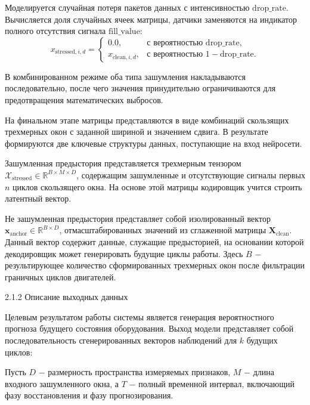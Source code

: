 \documentclass[14pt, a4paper, oneside]{extreport}
\begin{document}
Моделируется случайная потеря пакетов данных с интенсивностью $\text{drop\_rate}$. Вычисляется доля случайных ячеек матрицы, датчики заменяются на индикатор полного отсутствия сигнала $\text{fill\_value}$:
\begin{equation}
x_{\text{stressed}, i, d} = \begin{cases} 
0.0, & \text{с вероятностью } \text{drop\_rate}, \\
x_{\text{clean}, i, d}, & \text{с вероятностью } 1 - \text{drop\_rate}.
\end{cases}
\end{equation}

В комбинированном режиме оба типа зашумления накладываются последовательно, после чего значения принудительно ограничиваются для предотвращения математических выбросов.

На финальном этапе матрицы представляются в виде комбинаций скользящих трехмерных окон с заданной шириной и значением сдвига. В результате формируются две ключевые структуры данных, поступающие на вход нейросети.

Зашумленная предыстория представляется трехмерным тензором $\mathcal{X}_{\text{stressed}} \in \mathbb{R}^{B \times M \times D}$, содержащим зашумленные и отсутствующие сигналы первых $n$ циклов скользящего окна. На основе этой матрицы кодировщик учится строить латентный вектор.

Не зашумленная предыстория представляет собой изолированный вектор $\mathbf{x}_{\text{anchor}} \in \mathbb{R}^{B \times D}$, отмасштабированных значений из сглаженной матрицы $\mathbf{X}_{\text{clean}}$. Данный вектор содержит данные, служащие предысторией, на основании которой декодировщик может генерировать будущие циклы работы.
Здесь $B$ $-$ результирующее количество сформированных трехмерных окон после фильтрации граничных циклов двигателей.

\clearpage
\vspace{1em}
{2.1.2 Описание выходных данных}
\vspace{1em}

Целевым результатом работы системы является генерация вероятностного прогноза будущего состояния оборудования. Выход модели представляет собой последовательность сгенерированных векторов наблюдений для $k$ будущих циклов:

Пусть $D$ $-$ размерность пространства измеряемых признаков, $M$ $-$ длина входного зашумленного окна, а $T$ $-$ полный временной интервал, включающий фазу восстановления и фазу прогнозирования.
\end{document}
